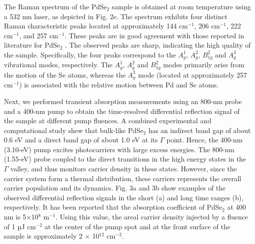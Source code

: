 \documentclass[twoside,twocolumn,9pt]{article}
\begin{document}
The Raman spectrum of the PdSe$_2$ sample is obtained at room temperature using a 532 nm laser, as depicted in Fig. 2e. The spectrum exhibits four distinct Raman characteristic peaks located at approximately 144 cm$^{-1}$, 206 cm$^{-1}$, 222 cm$^{-1}$, and 257 cm$^{-1}$. These peaks are in good agreement with those reported in literature for PdSe$_2$ .\cite{oyedele2017pdse2,huo2021thickness} The observed peaks are sharp, indicating the high quality of the sample. Specifically, the four peaks correspond to the $A_g^1$, $A_g^2$, $B_{1g}^2$  and $A_g^3$ vibrational modes, respectively. The $A_g^1$, $A_g^2$ and $B_{1g}^2$ modes primarily arise from the motion of the Se atoms, whereas the $A_g^3$ mode (located at approximately 257 cm$^{-1}$) is associated with the relative motion between Pd and Se atoms.



Next, we performed transient absorption measurements using an 800-nm probe and a 400-nm pump to obtain the time-resolved differential reflection signal of the sample at different pump fluences. A combined experimental and computational study shew that bulk-like PdSe$_2$ has an indirect band gap of about 0.6 eV and a direct band gap of about 1.0 eV at its ${\Gamma}$ point.\cite{wei2022layer}  Hence, the 400-nm (3.10-eV) pump excites photocarriers with large excess energies. The 800-nm (1.55-eV) probe coupled to the direct transitions in the high energy states in the ${\Gamma}$ valley, and thus monitors carrier density in these states. However, since the carrier system form a thermal distribution, these carriers represents the overall carrier population and its dynamics. Fig. 3a and 3b show examples of the observed differential reflection signals in the short (a) and long time ranges (b), respectively. It has been reported that the absorption coefficient of PdSe$_2$ at 400 nm is 5×10$^{8}$ m$^{-1}$.\cite{ye2021layer} Using this value, the areal carrier density injected by a fluence of 1 µJ cm$^{-2}$ at the center of the pump spot and at the front surface of the sample is approximately 2 × 10$^{12}$ cm$^{-2}$.
\end{document}
